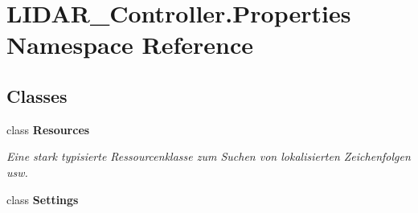 \hypertarget{namespace_l_i_d_a_r___controller_1_1_properties}{}\section{L\+I\+D\+A\+R\+\_\+\+Controller.\+Properties Namespace Reference}
\label{namespace_l_i_d_a_r___controller_1_1_properties}
\subsection*{Classes}
\begin{DoxyCompactItemize}
\item 
class {\bfseries Resources}
\begin{DoxyCompactList}\small\item\em Eine stark typisierte Ressourcenklasse zum Suchen von lokalisierten Zeichenfolgen usw. \end{DoxyCompactList}\item 
class {\bfseries Settings}
\end{DoxyCompactItemize}
